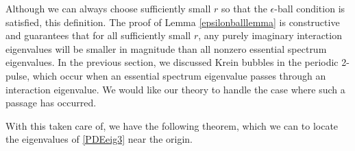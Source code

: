 \documentclass[thesis.tex]{subfiles}
\begin{document}
Although we can always choose sufficiently small $r$ so that the $\epsilon$-ball condition is satisfied, this definition. The proof of Lemma \ref{epsilonballlemma} is constructive and guarantees that for all sufficiently small $r$, any purely imaginary interaction eigenvalues will be smaller in magnitude than all nonzero essential spectrum eigenvalues. In the previous section, we discussed Krein bubbles in the periodic 2-pulse, which occur when an essential spectrum eigenvalue passes through an interaction eigenvalue. We would like our theory to handle the case where such a passage has occurred.

With this taken care of, we have the following theorem, which we can to locate the eigenvalues of \eqref{PDEeig3} near the origin.

\end{document}
